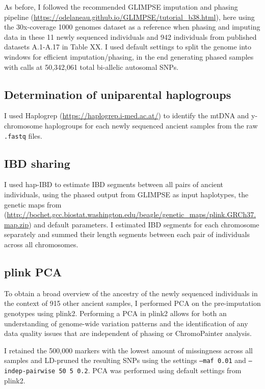As before, I followed the recommended GLIMPSE \cite{rubinacci2021efficient} imputation and phasing pipeline (\url{https://odelaneau.github.io/GLIMPSE/tutorial_b38.html}), here using the 30x-coverage 1000 genomes dataset \cite{byrska2021high} as a reference when phasing and imputing data in these 11 newly sequenced individuals and 942 individuals from published datasets A.1-A.17 in Table XX. I used default settings to split the genome into windows for efficient imputation/phasing, in the end generating phased samples with calls at 50,342,061 total bi-allelic autosomal SNPs.


\subsection{Determination of uniparental haplogroups}

I used Haplogrep (\url{https://haplogrep.i-med.ac.at/}) to identify the mtDNA and y-chromosome haplogroups for each newly sequenced ancient samples \cite{weissensteiner2016haplogrep} from the raw \texttt{.fastq} files.


\subsection{IBD sharing}

I used hap-IBD \cite{zhou2020fast} to estimate IBD segments between all pairs of ancient individuals, using the phased output from GLIMPSE as input haplotypes, the genetic maps  from (\url{http://bochet.gcc.biostat.washington.edu/beagle/genetic_maps/plink.GRCh37.map.zip}) and default parameters. I estimated IBD segments for each chromosome separately and summed their length segments between each pair of individuals across all chromosomes. 

\subsection{plink PCA}

To obtain a broad overview of the ancestry of the newly sequenced individuals in the context of 915 other ancient samples, I performed PCA on the pre-imputation genotypes using plink2. Performing a PCA in plink2 allows for both an understanding of genome-wide variation patterns and the identification of any data quality issues that are independent of phasing or ChromoPainter analysis. 

I retained the 500,000 markers with the lowest amount of missingness across all samples and LD-pruned the resulting SNPs using the settings \texttt{--maf 0.01} and \texttt{--indep-pairwise 50 5 0.2}. PCA was performed using default settings from plink2.

